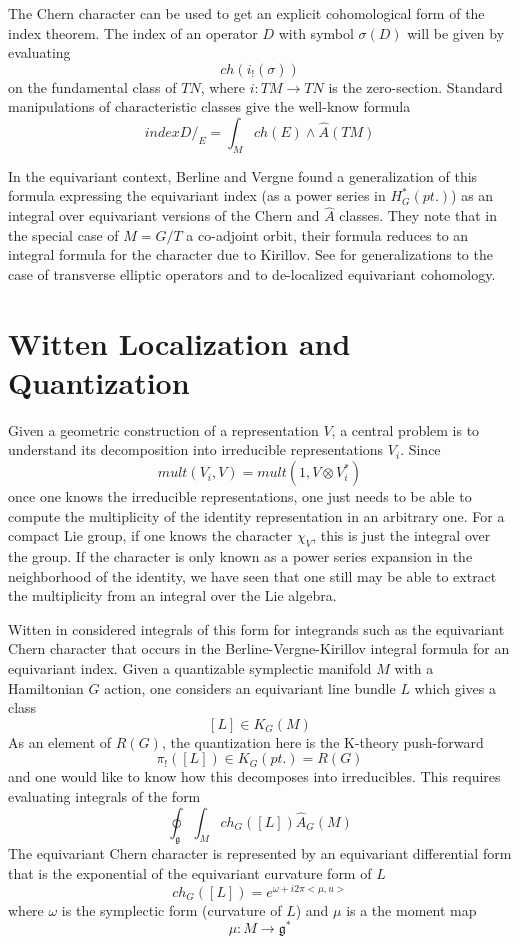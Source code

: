 \documentclass[a4paper,a4paper]{article}
\theoremstyle{conjecture}
\def\Slash#1{#1\!\!\!\!/}
\def\Dirac{\Slash D}
\begin{document}
The Chern character can be used to get an explicit cohomological form of the index theorem.
The index of an operator $D$ with symbol $\sigma(D)$ will be given by evaluating 
$$ch(i_!(\sigma))$$
on the fundamental class of $TN$, where $i:TM\rightarrow TN$ is the zero-section.  Standard
manipulations of characteristic classes give the well-know formula 
$$index \Dirac _E =\int_M ch(E)\wedge \hat A(TM)$$

In the equivariant context, Berline and Vergne \cite{BV0,BGV} found a generalization of this formula  
expressing the equivariant index (as a power series in $H_G^*(pt.)$) as an integral over equivariant
versions of the Chern and $\hat A$ classes.  They note that in the special case of $M=G/T$ a co-adjoint
orbit, their formula reduces to an integral formula for the character due to Kirillov.  See 
\cite{BV1,BV2,Duflo-Vergne} for generalizations to the case of transverse elliptic operators and
to de-localized equivariant cohomology.


\section{Witten Localization and Quantization}
\label{witten-localization}

Given a geometric construction of a representation $V$, a central problem
is to understand its decomposition into irreducible representations $V_i$. 
Since
$$mult(V_i,V)=mult(1,V\otimes V_i^*)$$
once one knows the irreducible representations, one just needs to be able
to compute the multiplicity of the identity representation in an arbitrary
one.  For a compact Lie group, if one knows the character $\chi _V$, this is
just the integral over the group. If the character is only known as a power
series expansion in the neighborhood of the identity, we have seen that one
still may be able to extract the multiplicity from an integral over the Lie
algebra.

Witten in \cite{Witten-localization} considered integrals of this form
for integrands such as the equivariant Chern character that occurs in the
Berline-Vergne-Kirillov integral formula for an equivariant index.  Given
a quantizable symplectic manifold $M$ with a Hamiltonian $G$ action, one
considers an equivariant line bundle $L$ which gives a class
$$[L]\in K_G(M)$$
As an element of $R(G)$, the quantization here is the K-theory push-forward
$$\pi_!([L])\in K_G(pt.)=R(G)$$
and one would like to know how this decomposes into irreducibles.  This
requires evaluating integrals of the form
$$\oint_{\mathfrak g}\int_M ch_G([L])\hat A_G(M)$$
The equivariant Chern character is represented by an equivariant differential
form that is the exponential of the equivariant curvature form of $L$
$$ch_G([L])=e^{\omega +i2\pi<\mu,u>}$$
where $\omega$ is the symplectic form (curvature of $L$) and $\mu$ is a the
moment map
$$\mu:M\rightarrow {\mathfrak g}^*$$
\end{document}
